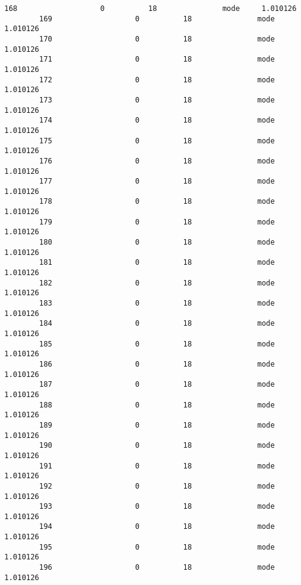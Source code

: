 \documentclass[11pt]{article}
\begin{document}
\begin{Verbatim}[commandchars=\\\{\}]
        168                   0          18               mode     1.010126   
        169                   0          18               mode     1.010126   
        170                   0          18               mode     1.010126   
        171                   0          18               mode     1.010126   
        172                   0          18               mode     1.010126   
        173                   0          18               mode     1.010126   
        174                   0          18               mode     1.010126   
        175                   0          18               mode     1.010126   
        176                   0          18               mode     1.010126   
        177                   0          18               mode     1.010126   
        178                   0          18               mode     1.010126   
        179                   0          18               mode     1.010126   
        180                   0          18               mode     1.010126   
        181                   0          18               mode     1.010126   
        182                   0          18               mode     1.010126   
        183                   0          18               mode     1.010126   
        184                   0          18               mode     1.010126   
        185                   0          18               mode     1.010126   
        186                   0          18               mode     1.010126   
        187                   0          18               mode     1.010126   
        188                   0          18               mode     1.010126   
        189                   0          18               mode     1.010126   
        190                   0          18               mode     1.010126   
        191                   0          18               mode     1.010126   
        192                   0          18               mode     1.010126   
        193                   0          18               mode     1.010126   
        194                   0          18               mode     1.010126   
        195                   0          18               mode     1.010126   
        196                   0          18               mode     1.010126   
        

\end{Verbatim}
\end{document}
